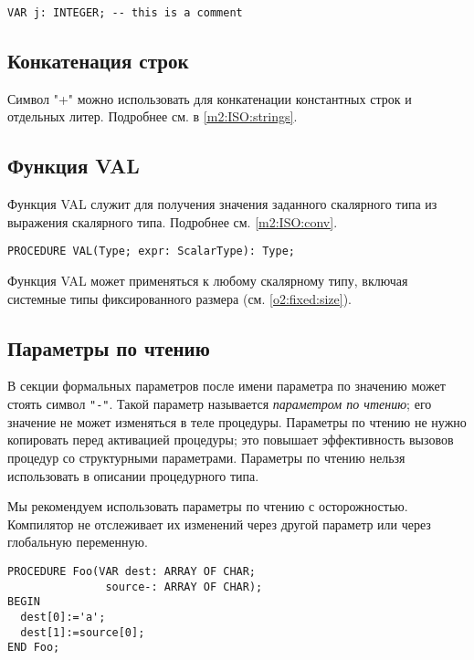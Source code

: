 \Example
\begin{verbatim}
VAR j: INTEGER; -- this is a comment
\end{verbatim}

\subsection{Конкатенация строк}

\oextonly

Символ "+" можно использовать для конкатенации константных строк
и отдельных литер. Подробнее см. в
\ref{m2:ISO:strings}.

\subsection{Функция VAL}

\oextonly

Функция VAL служит для получения значения заданного скалярного типа
из выражения скалярного типа. Подробнее см. \ref{m2:ISO:conv}.
\begin{verbatim}
PROCEDURE VAL(Type; expr: ScalarType): Type;
\end{verbatim}

Функция VAL может применяться к любому скалярному типу,
включая системные типы фиксированного размера
(см. \ref{o2:fixed:size}).

\subsection{Параметры по чтению}

\oextonly

В секции формальных параметров после имени параметра по значению
может стоять символ \verb|"-"|. Такой параметр называется
{\em параметром по чтению}; его значение не может изменяться в 
теле процедуры.
Параметры по чтению не нужно копировать перед активацией процедуры;
это повышает эффективность вызовов процедур со структурными
параметрами.
Параметры по чтению нельзя использовать в описании процедурного типа.

Мы рекомендуем использовать параметры по чтению с осторожностью.
Компилятор не отслеживает их изменений через другой параметр
или через глобальную переменную.

\Example
\begin{verbatim}
PROCEDURE Foo(VAR dest: ARRAY OF CHAR;
               source-: ARRAY OF CHAR);
BEGIN
  dest[0]:='a';
  dest[1]:=source[0];
END Foo;
\end{verbatim}

